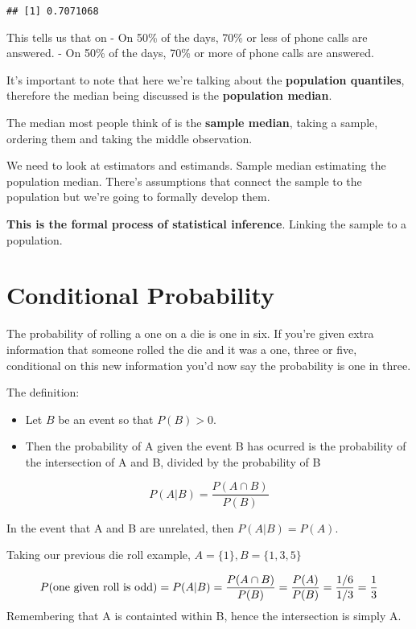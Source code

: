\documentclass[]{article}
\providecommand{\tightlist}{%
  \setlength{\itemsep}{0pt}\setlength{\parskip}{0pt}}
\begin{document}
\begin{verbatim}
## [1] 0.7071068
\end{verbatim}

This tells us that on - On 50\% of the days, 70\% or less of phone calls
are answered. - On 50\% of the days, 70\% or more of phone calls are
answered.

It's important to note that here we're talking about the
\textbf{population quantiles}, therefore the median being discussed is
the \textbf{population median}.

The median most people think of is the \textbf{sample median}, taking a
sample, ordering them and taking the middle observation.

We need to look at estimators and estimands. Sample median estimating
the population median. There's assumptions that connect the sample to
the population but we're going to formally develop them.

\textbf{This is the formal process of statistical inference}. Linking
the sample to a population.

\hypertarget{conditional-probability}{%
\section{Conditional Probability}\label{conditional-probability}}

The probability of rolling a one on a die is one in six. If you're given
extra information that someone rolled the die and it was a one, three or
five, conditional on this new information you'd now say the probability
is one in three.

The definition:

\begin{itemize}
\tightlist
\item
  Let \(B\) be an event so that \(P(B) > 0\).
\item
  Then the probability of A given the event B has ocurred is the
  probability of the intersection of A and B, divided by the probability
  of B
\end{itemize}

\[ P(A|B) = \frac{ P(A \cap B) }{ P(B) }\]

In the event that A and B are unrelated, then \(P(A|B) = P(A)\).

Taking our previous die roll example, \(A = \{1\}, B = \{1,3,5\}\)

\[
P(\text{one given roll is odd}) = P(A|B) \\
= \frac{P(A \cap B)}{P(B)} \\
= \frac{P(A)}{P(B)} \\
= \frac{1/6}{1/3} \\
= \frac{1}{3}
\] Remembering that A is containted within B, hence the intersection is
simply A.
\end{document}
